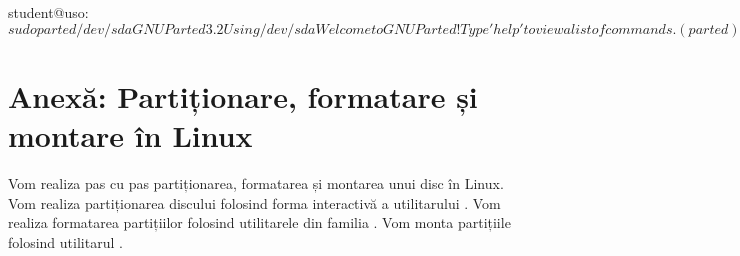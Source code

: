 \begin{screen}[caption={Gestiunea discurilor folosind parted},label={lst:storage:parted}]
student@uso:~$ sudo parted /dev/sda
GNU Parted 3.2
Using /dev/sda
Welcome to GNU Parted! Type 'help' to view a list of commands.
(parted) help
  align-check TYPE N                        check partition N for TYPE(min|opt) alignment
  help [COMMAND]                           print general help, or help on COMMAND
  mklabel,mktable LABEL-TYPE               create a new disklabel (partition table)
  mkpart PART-TYPE [FS-TYPE] START END     make a partition
  name NUMBER NAME                         name partition NUMBER as NAME
  print [devices|free|list,all|NUMBER]     display the partition table, available devices, free space, all found partitions, or a particular partition
  quit                                     exit program
  rescue START END                         rescue a lost partition near START and END
  resizepart NUMBER END                    resize partition NUMBER
  rm NUMBER                                delete partition NUMBER
  select DEVICE                            choose the device to edit
  disk_set FLAG STATE                      change the FLAG on selected device
  disk_toggle [FLAG]                       toggle the state of FLAG on selected device
  set NUMBER FLAG STATE                    change the FLAG on partition NUMBER
  toggle [NUMBER [FLAG]]                   toggle the state of FLAG on partition NUMBER
  unit UNIT                                set the default unit to UNIT
  version                                  display the version number and copyright information of GNU Parted
(parted) p
Model: ATA VBOX HARDDISK (scsi)
Disk /dev/sda: 17.2GB
Sector size (logical/physical): 512B/512B
Partition Table: msdos
Disk Flags:

Number  Start   End     Size    Type     File system  Flags
 1      1049kB  17.2GB  17.2GB  primary  ext4         boot

(parted) q

student@uso:~$
\end{screen}

\section{Anexă: Partiționare, formatare și montare în Linux}
\label{sec:storage:partition-cmd}

Vom realiza pas cu pas partiționarea, formatarea și montarea unui disc în Linux.
Vom realiza partiționarea discului folosind forma interactivă a utilitarului .
Vom realiza formatarea partițiilor folosind utilitarele din familia .
Vom monta partițiile folosind utilitarul .

